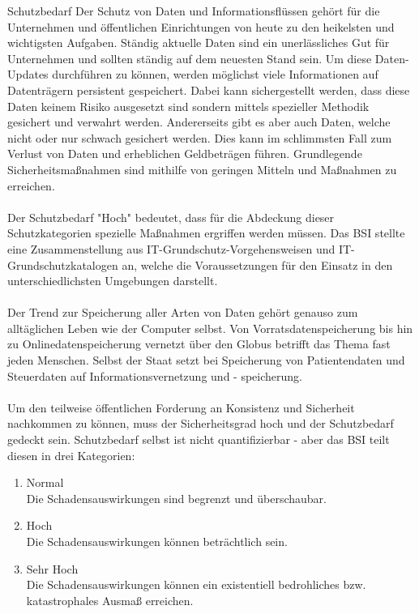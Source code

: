  \label{Schutzbedarf}
 \begin{section}{Schutzbedarf}
  Der Schutz von Daten und Informationsflüssen gehört für die Unternehmen und öffentlichen
  Einrichtungen von heute zu den heikelsten und wichtigsten Aufgaben. Ständig aktuelle 
  Daten sind ein unerlässliches Gut für Unternehmen und sollten ständig auf dem neuesten 
  Stand sein. Um diese Daten-Updates durchführen zu können, werden möglichst viele 
  Informationen auf Datenträgern persistent gespeichert. Dabei kann sichergestellt werden, 
  dass diese Daten keinem Risiko ausgesetzt sind sondern mittels spezieller Methodik 
  gesichert und verwahrt werden. Andererseits gibt es aber auch Daten, welche nicht oder 
  nur schwach gesichert werden. Dies kann im schlimmsten Fall zum Verlust von Daten und 
  erheblichen Geldbeträgen führen. Grundlegende Sicherheitsmaßnahmen sind mithilfe von 
  geringen Mitteln und Maßnahmen zu erreichen. \\
  \\
  Der Schutzbedarf "Hoch" bedeutet, dass für die Abdeckung dieser Schutzkategorien 
  spezielle Maßnahmen ergriffen werden müssen. 
  Das \ac{BSI} stellte eine Zusammenstellung aus IT-Grundschutz-Vorgehensweisen und IT-Grundschutzkatalogen
  an, welche die Voraussetzungen für den Einsatz in den unterschiedlichsten Umgebungen 
  darstellt. \\
  \\
  Der Trend zur Speicherung aller Arten von Daten gehört genauso zum alltäglichen Leben 
  wie der Computer selbst. Von Vorratsdatenspeicherung bis hin zu Onlinedatenspeicherung 
  vernetzt über den Globus betrifft das Thema fast jeden Menschen. Selbst der Staat setzt 
  bei Speicherung von Patientendaten und Steuerdaten auf Informationsvernetzung und - 
  speicherung. \\
  \\
  Um den teilweise öffentlichen Forderung an Konsistenz und Sicherheit nachkommen zu 
  können, muss der Sicherheitsgrad hoch und der Schutzbedarf gedeckt sein. 
  Schutzbedarf selbst ist nicht quantifizierbar - aber das \ac{BSI} teilt diesen in drei 
  Kategorien: \\
  \begin{enumerate} 
   \item Normal \\
    Die Schadensauswirkungen sind begrenzt und überschaubar.
   \item Hoch \\
    Die Schadensauswirkungen können beträchtlich sein.
   \item Sehr Hoch \\
    Die Schadensauswirkungen können ein existentiell bedrohliches bzw. katastrophales 
    Ausmaß erreichen. \cite{BSIBedarf}
  \end{enumerate}
  \pagebreak


\end{section}
